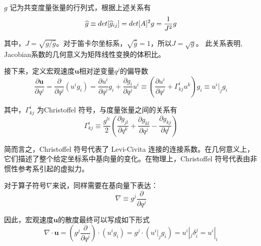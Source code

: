 \documentclass[LBMDerivation.tex]{subfiles}
\begin{document}
$g $ 记为共变度量张量的行列式，根据上述关系有
\begin{equation}
  \widehat{g} \equiv det[\widehat{g}_{i j}]=det[A]^{2} g = {1\over J^2} g
\end{equation}

其中，$J=\sqrt{g / \widehat{g}}$。对于笛卡尔坐标系，$\sqrt{\widehat{g}}=1$，所以$J=\sqrt{g}$。
此关系表明, Jacobian系数的几何意义为矩阵线性变换的体积比。



接下来，定义宏观速度$\boldsymbol{u}$相对逆变量$q^j$的偏导数
\begin{equation}
  \frac{\partial \boldsymbol{u}}{\partial q^{j}}=\frac{\partial}{\partial q^{j}}\left(u^{i} g_{i}\right)=\frac{\partial u^i}{\partial q^j}g_i + \frac{\partial g_i}{\partial q^j}u^i\equiv \left(\frac{\partial u^{i}}{\partial q^{j}}+\Gamma_{k j}^{i} u^{k}\right) g_{i}\equiv u^{i}|_{j} g_{i}
\end{equation}

其中，$\Gamma_{k j}^{i} $ 为Christoffel 符号，与度量张量之间的关系有
\begin{equation}
  \Gamma_{k j}^{i} \equiv \frac{g^{l i}}{2}\left(\frac{\partial g_{j l}}{\partial q^{k}}+\frac{\partial g_{k l}}{\partial q^{j}}-\frac{\partial g_{k j}}{\partial q^{l}}\right)
\end{equation}

简而言之，Christoffel 符号代表了 Levi-Civita 连接的连接系数。在几何意义上，它们描述了整个给定坐标系中基向量的变化。在物理上，Christoffel 符号代表由非惯性参考系引起的虚拟力。


对于算子符号$\nabla$来说，同样需要在基向量下表达：
\begin{equation}
  \nabla\equiv g^{j} \frac{\partial}{\partial q^{j}}
\end{equation}

因此，宏观速度$\boldsymbol{u}$的散度最终可以写成如下形式
\begin{equation}
  \nabla \cdot \boldsymbol{u}=\left(g^{j} \frac{\partial}{\partial q^{j}}\right) \cdot\left(u^{i} g_{i}\right)=g^{j} \cdot\left(u^{i}|_{j} g_{i}\right)=u^{i}|_{j} \delta_{i}^{j}=u^{i}|_{i}
\end{equation}
\end{document}
